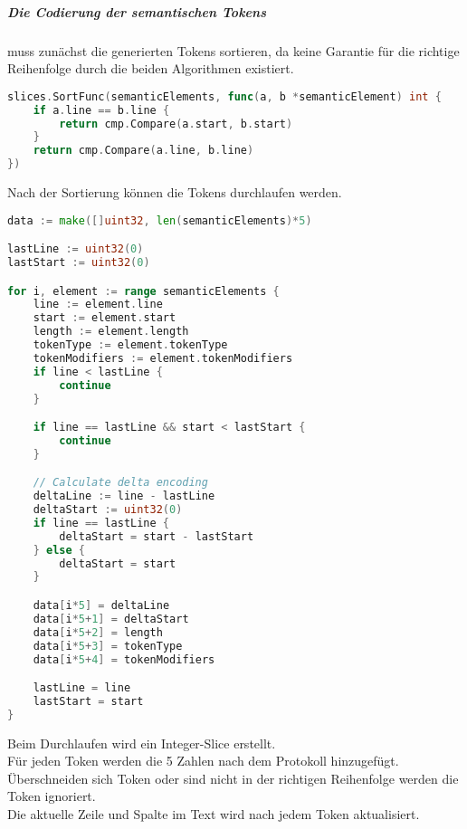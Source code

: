 \documentclass[./einleitung.tex]{subfiles}
\begin{document}
    \subparagraph{Die Codierung der semantischen Tokens} muss zunächst die generierten Tokens sortieren, da keine Garantie für die richtige Reihenfolge durch die beiden Algorithmen existiert.
    \begin{lstlisting}[language=Go,label={lst:sortSemanticTokens}]
slices.SortFunc(semanticElements, func(a, b *semanticElement) int {
    if a.line == b.line {
        return cmp.Compare(a.start, b.start)
    }
    return cmp.Compare(a.line, b.line)
})
    \end{lstlisting}
    Nach der Sortierung können die Tokens durchlaufen werden.
    \begin{lstlisting}[language=Go]
data := make([]uint32, len(semanticElements)*5)

lastLine := uint32(0)
lastStart := uint32(0)

for i, element := range semanticElements {
    line := element.line
    start := element.start
    length := element.length
    tokenType := element.tokenType
    tokenModifiers := element.tokenModifiers
    if line < lastLine {
        continue
    }

    if line == lastLine && start < lastStart {
        continue
    }

    // Calculate delta encoding
    deltaLine := line - lastLine
    deltaStart := uint32(0)
    if line == lastLine {
        deltaStart = start - lastStart
    } else {
        deltaStart = start
    }

    data[i*5] = deltaLine
    data[i*5+1] = deltaStart
    data[i*5+2] = length
    data[i*5+3] = tokenType
    data[i*5+4] = tokenModifiers

    lastLine = line
    lastStart = start
}
    \end{lstlisting}
    Beim Durchlaufen wird ein Integer-Slice erstellt. \\
    Für jeden Token werden die 5 Zahlen nach dem Protokoll hinzugefügt. \\
    Überschneiden sich Token oder sind nicht in der richtigen Reihenfolge werden die Token ignoriert. \\
    Die aktuelle Zeile und Spalte im Text wird nach jedem Token aktualisiert.
\end{document}
